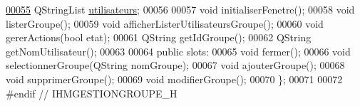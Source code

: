 \begin{DoxyCode}
\hyperlink{class_ihm_gestion_groupe_a1f14e24cf672c5d0b6ae86084f758846}{00055}     QStringList \hyperlink{class_ihm_gestion_groupe_a1f14e24cf672c5d0b6ae86084f758846}{utilisateurs};
00056 
00057     \textcolor{keywordtype}{void} initialiserFenetre();    
00058     \textcolor{keywordtype}{void} listerGroupe();
00059     \textcolor{keywordtype}{void} afficherListerUtilisateursGroupe();
00060     \textcolor{keywordtype}{void} gererActions(\textcolor{keywordtype}{bool} etat);
00061     QString getIdGroupe();
00062     QString getNomUtilisateur();
00063 
00064 \textcolor{keyword}{public} slots:
00065     \textcolor{keywordtype}{void} fermer();    
00066     \textcolor{keywordtype}{void} selectionnerGroupe(QString nomGroupe);
00067     \textcolor{keywordtype}{void} ajouterGroupe();
00068     \textcolor{keywordtype}{void} supprimerGroupe();
00069     \textcolor{keywordtype}{void} modifierGroupe();
00070 \};
00071 
00072 \textcolor{preprocessor}{#endif // IHMGESTIONGROUPE\_H}
\end{DoxyCode}
